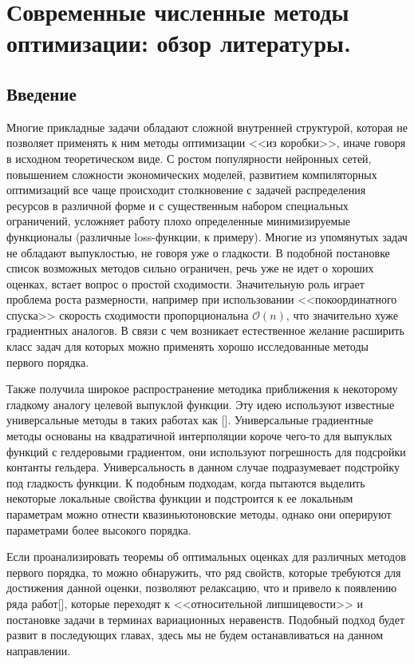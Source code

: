 \chapter{Современные численные методы оптимизации: обзор литератyры.}\label{ch:ch1}

\section{Введение}\label{sec:ch1/sec1}

  Многие прикладные задачи обладают сложной внутренней структурой, которая не позволяет применять к ним методы оптимизации <<из коробки>>, иначе говоря в исходном теоретическом виде. С ростом популярности нейронных сетей, повышением сложности экономических моделей, развитием компиляторных оптимизаций все чаще происходит столкновение с задачей распределения ресурсов в различной форме и с существенным набором специальных ограничений, усложняет работу плохо определенные минимизируемые функционалы (различные loss-функции, к примеру). Многие из упомянутых задач не обладают выпуклостью, не говоря уже о гладкости. В подобной постановке список возможных методов сильно ограничен,  речь уже не идет о хороших оценках, встает вопрос о простой сходимости. Значительную роль играет проблема роста размерности, например при использовании <<покоординатного спуска>> скорость сходимости пропорциональна $\mathcal{O} (n)$, что значительно хуже градиентных аналогов. В связи с чем возникает естественное желание расширить класс задач для которых можно применять хорошо исследованные методы первого порядка. 

  Также получила широкое распространение методика приближения к некоторому гладкому аналогу целевой выпуклой функции. Эту идею используют известные универсальные методы в таких работах как []. Универсальные градиентные методы основаны на квадратичной интерполяции короче чего-то для выпуклых функций с гелдеровыми градиентом, они используют погрешность для подсройки контанты гельдера. Универсальность в данном случае подразумевает подстройку под гладкость функции. К подобным подходам, когда пытаются выделить некоторые локальные свойства функции и подстроится к ее локальным параметрам можно отнести квазиньютоновские методы, однако они оперируют параметрами более высокого порядка. 

  Если проанализировать теоремы об оптимальных оценках для различных методов первого порядка, то можно обнаружить, что ряд свойств, которые требуются для достижения данной оценки, позволяют релаксацию, что и привело к появлению ряда работ[], которые переходят к <<относительной липшицевости>> и постановке задачи в терминах вариационных неравенств. Подобный подход будет развит в последующих главах, здесь мы не будем останавливаться на данном направлении.


